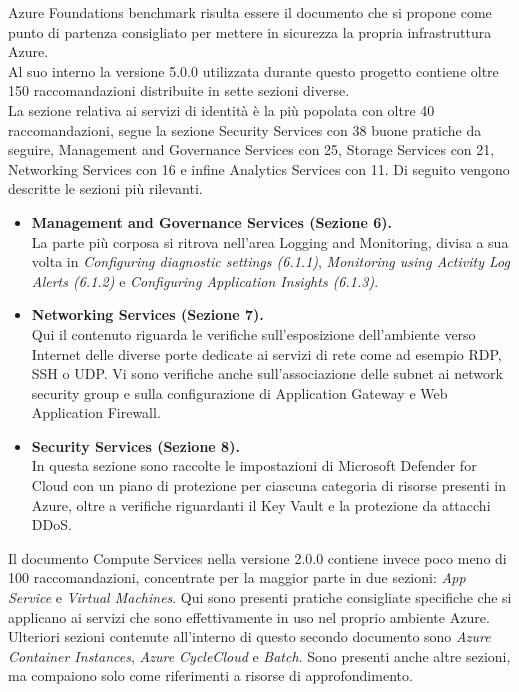 \documentclass[a4paper,11pt]{report}
\begin{document}
Azure Foundations benchmark risulta essere il documento che si propone come punto di partenza consigliato per mettere in sicurezza la propria infrastruttura Azure.\\
Al suo interno la versione 5.0.0 utilizzata durante questo progetto contiene oltre 150 raccomandazioni distribuite in sette sezioni diverse.\\
La sezione relativa ai servizi di identità è la più popolata con oltre 40 raccomandazioni, segue la sezione Security Services con 38 buone pratiche da seguire, Management and Governance Services con 25, Storage Services con 21, Networking Services con 16 e infine Analytics Services con 11. Di seguito vengono descritte le sezioni più rilevanti.

\begin{itemize}
\item \textbf{Management and Governance Services (Sezione 6).}\\
La parte più corposa si ritrova nell'area Logging and Monitoring, divisa a sua volta in \textit{Configuring diagnostic settings (6.1.1)}, \textit{Monitoring using Activity Log Alerts (6.1.2)} e \textit{Configuring Application Insights (6.1.3)}.
\item \textbf{Networking Services (Sezione 7).}\\
Qui il contenuto riguarda le verifiche sull'esposizione dell'ambiente verso Internet delle diverse porte dedicate ai servizi di rete come ad esempio RDP, SSH o UDP. Vi sono verifiche anche sull'associazione delle subnet ai network security group e sulla configurazione di Application Gateway e Web Application Firewall.
\item \textbf{Security Services (Sezione 8).}\\
In questa sezione sono raccolte le impostazioni di Microsoft Defender for Cloud con un piano di protezione per ciascuna categoria di risorse presenti in Azure, oltre a verifiche riguardanti il Key Vault e la protezione da attacchi DDoS.
\end{itemize}

Il documento Compute Services nella versione 2.0.0 contiene invece poco meno di 100 raccomandazioni, concentrate per la maggior parte in due sezioni: \textit{App Service} e \textit{Virtual Machines}.
Qui sono presenti pratiche consigliate specifiche che si applicano ai servizi che sono effettivamente in uso nel proprio ambiente Azure. Ulteriori sezioni contenute all'interno di questo secondo documento sono \textit{Azure Container Instances}, \textit{Azure CycleCloud} e \textit{Batch}.
Sono presenti anche altre sezioni, ma compaiono solo come riferimenti a risorse di approfondimento.\\
\end{document}
